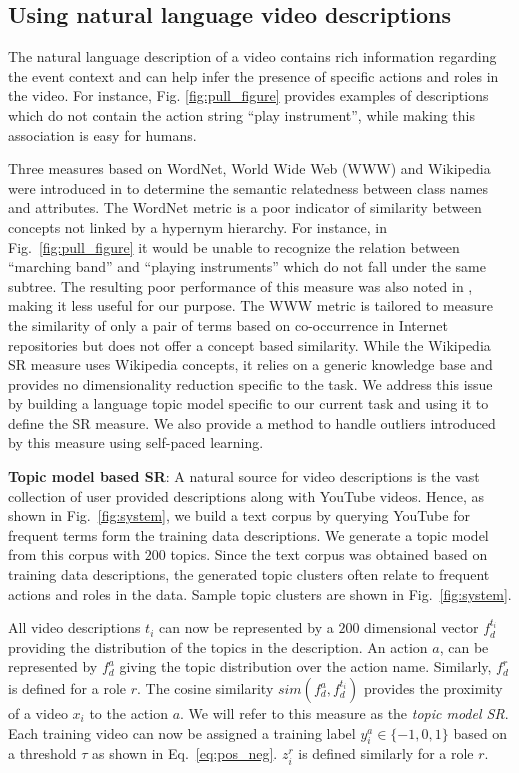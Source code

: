 \documentclass[10pt,twocolumn,letterpaper]{article}
\begin{document}
\subsection{Using natural language video descriptions} \label{sec:NLP}
The natural language description of a video contains rich information regarding
the event context and can help infer the presence of specific actions and roles
in the video. For instance, Fig. \ref{fig:pull_figure} provides examples of
descriptions which do not contain the action string ``play instrument'',
while making this association is easy for humans.

Three measures based on WordNet, World Wide Web (WWW) and Wikipedia were
introduced in \cite{Rohrbach_CVPR10} to determine the semantic relatedness
between class names and attributes. The WordNet metric is a poor indicator of similarity between
concepts not linked by a hypernym hierarchy. For instance, in
Fig.~\ref{fig:pull_figure} it would be unable to recognize the relation between
``marching band'' and ``playing instruments'' which do not fall under the same
subtree. The resulting poor performance of this measure was also noted in
\cite{Rohrbach_CVPR10}, making it less useful for our purpose. The WWW metric
is tailored to measure the similarity of only a pair of terms based on
co-occurrence in Internet repositories but does not offer a concept based
similarity. While the Wikipedia SR measure uses Wikipedia concepts, it relies
on a generic knowledge base and provides no dimensionality reduction specific
to the task. We address this issue by building a language topic model specific
to our current task and using it to define the SR measure. We also provide a
method to handle outliers introduced by this measure using self-paced learning.

\noindent \textbf{Topic model based SR}: A natural source for video descriptions is the vast collection of user provided descriptions along with YouTube videos. Hence, as shown in Fig.~\ref{fig:system}, we build a text corpus by querying YouTube for frequent terms form the training data descriptions. We generate a topic model from this corpus with $200$ topics. Since the text corpus was obtained based on training data descriptions, the generated topic clusters often relate to frequent actions and roles in the data. Sample topic clusters are shown in Fig.~\ref{fig:system}.

All video descriptions $t_i$ can now be represented by a $200$ dimensional
vector $f_{d}^{t_i}$ providing the distribution of the topics in the
description. An action $a$, can be represented by $f_{d}^a$ giving the topic
distribution over the action name. Similarly, $f_{d}^r$ is defined for a role
$r$.  The cosine similarity $sim \left(f_{d}^a, f_{d}^{t_i}\right)$ provides
the proximity of a video $x_i$ to the action $a$. We will refer to this measure
as the \textit{topic model SR}. Each training video can now be assigned a
training label $y_i^a \in \{-1,0,1\}$ based on a threshold $\tau$ as shown in
Eq.~\ref{eq:pos_neg}. $z_i^r$ is defined similarly for a role $r$.
\end{document}
